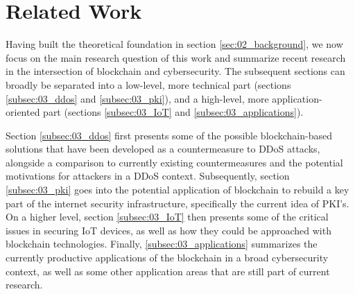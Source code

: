 \section{Related Work}
\label{sec:03_related_work}

Having built the theoretical foundation in section \ref{sec:02_background}, we now focus on the main research question of this work and summarize recent research in the intersection of blockchain and cybersecurity. The subsequent sections can broadly be separated into a low-level, more technical part (sections \ref{subsec:03_ddos} and \ref{subsec:03_pki}), and a high-level, more application-oriented part (sections \ref{subsec:03_IoT} and \ref{subsec:03_applications}).

Section \ref{subsec:03_ddos} first presents some of the possible blockchain-based solutions that have been developed as a countermeasure to DDoS attacks, alongside a comparison to currently existing countermeasures and the potential motivations for attackers in a DDoS context. Subsequently, section \ref{subsec:03_pki} goes into the potential application of blockchain to rebuild a key part of the internet security infrastructure, specifically the current idea of PKI's. On a higher level, section \ref{subsec:03_IoT} then presents some of the critical issues in securing IoT devices, as well as how they could be approached with blockchain technologies. Finally, \ref{subsec:03_applications} summarizes the currently productive applications of the blockchain in a broad cybersecurity context, as well as some other application areas that are still part of current research.





